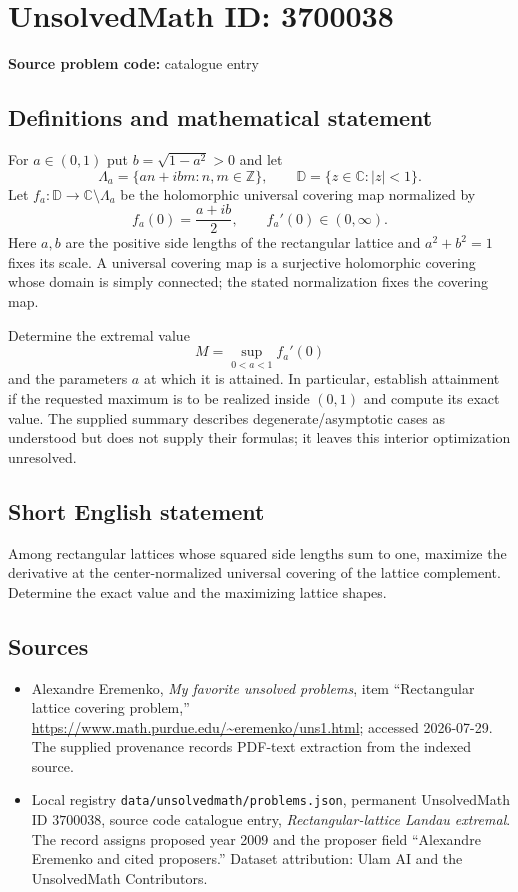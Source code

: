 \documentclass[11pt]{article}
\begin{document}
\section*{UnsolvedMath ID: 3700038}
\textbf{Source problem code:} catalogue entry
\subsection{Definitions and mathematical statement}
For $a\in(0,1)$ put $b=\sqrt{1-a^2}>0$ and let
\[
\Lambda_a=\{an+ibm:n,m\in\mathbb Z\},\qquad
\mathbb D=\{z\in\mathbb C:|z|<1\}.
\]
Let $f_a:\mathbb D\to\mathbb C\setminus\Lambda_a$ be the holomorphic universal covering map normalized by
\[
f_a(0)=\frac{a+ib}{2},\qquad f_a'(0)\in(0,\infty).
\]
Here $a,b$ are the positive side lengths of the rectangular lattice and $a^2+b^2=1$ fixes its scale. A universal covering map is a surjective holomorphic covering whose domain is simply connected; the stated normalization fixes the covering map.

Determine the extremal value
\[
M=\sup_{0<a<1}f_a'(0)
\]
and the parameters $a$ at which it is attained. In particular, establish attainment if the requested maximum is to be realized inside $(0,1)$ and compute its exact value. The supplied summary describes degenerate/asymptotic cases as understood but does not supply their formulas; it leaves this interior optimization unresolved.
\subsection{Short English statement}
Among rectangular lattices whose squared side lengths sum to one, maximize the derivative at the center-normalized universal covering of the lattice complement. Determine the exact value and the maximizing lattice shapes.
\subsection{Sources}
\begin{itemize}
\item Alexandre Eremenko, \emph{My favorite unsolved problems}, item ``Rectangular lattice covering problem,'' \url{https://www.math.purdue.edu/~eremenko/uns1.html}; accessed 2026-07-29. The supplied provenance records PDF-text extraction from the indexed source.
\item Local registry \texttt{data/unsolvedmath/problems.json}, permanent UnsolvedMath ID $3700038$, source code catalogue entry, \emph{Rectangular-lattice Landau extremal}. The record assigns proposed year 2009 and the proposer field ``Alexandre Eremenko and cited proposers.'' Dataset attribution: Ulam AI and the UnsolvedMath Contributors.
\end{itemize}
\end{document}
